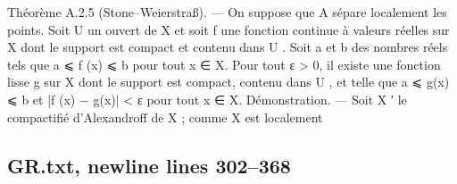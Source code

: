 \documentclass[
  10pt,
]{article}
\newenvironment{Shaded}{}{}
\newcommand{\NormalTok}[1]{#1}
\begin{document}
\begin{Shaded}
\begin{Highlighting}[]
\NormalTok{Théorème A.2.5 (Stone–Weierstraß). — On suppose que A sépare localement les}
\NormalTok{points. Soit U un ouvert de X et soit f une fonction continue à valeurs réelles sur X}
\NormalTok{dont le support est compact et contenu dans U . Soit a et b des nombres réels tels que}
\NormalTok{a ⩽ f (x) ⩽ b pour tout x ∈ X.}
\NormalTok{  Pour tout ε \textgreater{} 0, il existe une fonction lisse g sur X dont le support est compact,}
\NormalTok{contenu dans U , et telle que a ⩽ g(x) ⩽ b et |f (x) − g(x)| \textless{} ε pour tout x ∈ X.}
\NormalTok{Démonstration. — Soit X ′ le compactifié d’Alexandroff de X ; comme X est localement}
\end{Highlighting}
\end{Shaded}

\subsection{GR.txt, newline lines
302--368}\label{gr.txt-newline-lines-302368}
\end{document}

